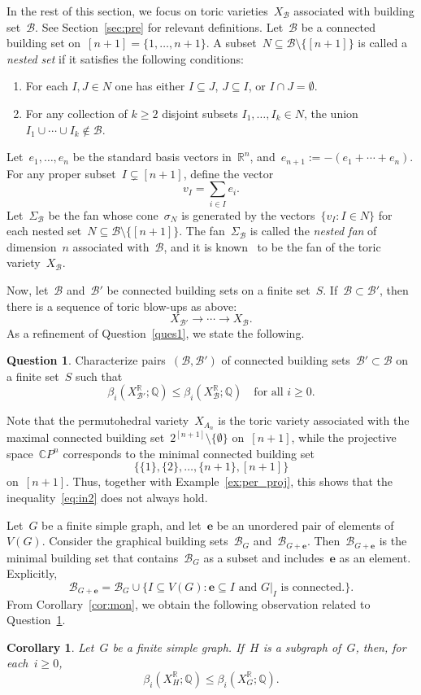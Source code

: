 \documentclass[10pt]{amsart}
\theoremstyle{plain}
\newtheorem{corollary}[theorem]{Corollary}
\numberwithin{equation}{section}
\theoremstyle{definition}
\newtheorem{question}[theorem]{Question}
\newcommand{\CP}{\mathbb{C}P}
\newcommand{\edge}{\mathbf{e}}
\newcommand{\B}{\mathcal{B}}
\newcommand{\Q}{\mathbb{Q}}
\newcommand{\R}{\mathbb{R}}
\begin{document}
In the rest of this section, we focus on toric varieties~$X_\B$ associated with building set~$\B$.
See Section~\ref{sec:pre} for relevant definitions.
Let~$\B$ be a connected building set on~$[n+1] = \{1,\ldots,n+1\}$.
A subset~$N \subseteq \B \setminus \{[n+1]\}$ is called a \emph{nested set} if it satisfies the following conditions:
\begin{enumerate}
  \item For each $I,J \in N$ one has either $I \subseteq J$, $J \subseteq I$, or $I \cap J = \emptyset$.
  \item For any collection of $k \geq 2$ disjoint subsets $I_1,\ldots,I_k \in N$, the union $I_1 \cup \cdots \cup I_k \notin \B$.
\end{enumerate}
Let~$e_1, \ldots, e_n$ be the standard basis vectors in~$\R^n$, and~$e_{n+1} := - (e_1 + \cdots + e_n)$.
For any proper subset~$I \subsetneq [n+1]$, define the vector
$$
v_I = \sum_{i \in I}e_i.
$$
Let~$\Sigma_\B$ be the fan whose cone~$\sigma_N$ is generated by the vectors~$\{v_I \colon I \in N\}$ for each nested set~$N \subseteq \B \setminus \{[n+1]\}$.
The fan~$\Sigma_\B$ is called the \emph{nested fan} of dimension~$n$ associated with~$\B$, and it is known~\cite{Zel2006} to be the fan of the toric variety~$X_\B$.

Now, let~$\B$ and~$\B'$ be connected building sets on a finite set~$S$.
If~$\B \subset \B'$, then there is a sequence of toric blow-ups as above:
$$
X_{\B'} \to \cdots \to X_{\B}.
$$
As a refinement of Question~\ref{ques1}, we state the following.
\begin{question}\label{ques2}
    Characterize pairs~$(\B,\B')$ of connected building sets~$\B' \subset \B$ on a finite set~$S$ such that
    \begin{equation}\label{eq:in2}
      \beta_i(X^\R_{\B'};\Q) \leq \beta_i(X^\R_{\B};\Q) \quad \text{for all } i \geq 0.
    \end{equation}
\end{question}
Note that the permutohedral variety~$X_{A_n}$ is the toric variety associated with 
the maximal connected building set~$2^{[n+1]} \setminus \{\emptyset\}$ on~$[n+1]$, 
while the projective space~$\CP^n$ corresponds to the minimal connected building set
\[
\{\{1\},\{2\},\ldots,\{n+1\},[n+1]\}
\]
on~$[n+1]$.
Thus, together with Example~\ref{ex:per_proj}, this shows that the inequality~\eqref{eq:in2} 
does not always hold.

Let~$G$ be a finite simple graph, and let~$\edge$ be an unordered pair of elements of~$V(G)$.
Consider the graphical building sets~$\B_G$ and~$\B_{G+\edge}$.
Then~$\B_{G+\edge}$ is the minimal building set that contains~$\B_G$ as a subset and includes~$\edge$ as an element.
Explicitly,
$$
\B_{G+\edge} = \B_G \cup \{I \subseteq V(G) \colon \edge \subseteq I \text{ and } G\vert_I \text{ is connected.}\}.
$$
From Corollary~\ref{cor:mon}, we obtain the following observation related to Question~\ref{ques2}.
\begin{corollary}
Let~$G$ be a finite simple graph.
If~$H$ is a subgraph of~$G$, then, for each~$i \ge 0$,
$$
\beta_i(X^\R_{H};\Q) \le \beta_i(X^\R_{G};\Q).
$$
\end{corollary}
\end{document}
